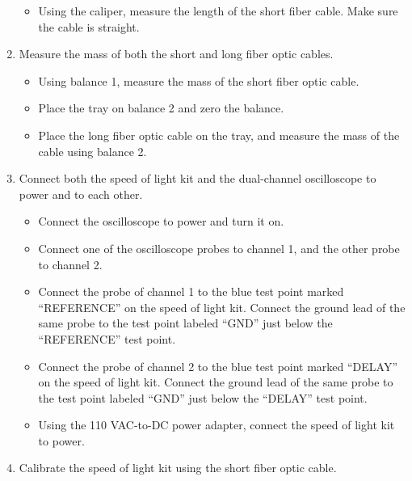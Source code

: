 \documentclass[12pt]{iopart} %
\begin{document}
\begin{enumerate}
  \begin{itemize}
  \item
    Using the caliper, measure the length of the short fiber cable. Make
    sure the cable is straight.
  \end{itemize}
\item
  Measure the mass of both the short and long fiber optic cables.

  \begin{itemize}
  \item
    Using balance 1, measure the mass of the short fiber optic cable.
  \item
    Place the tray on balance 2 and zero the balance.
  \item
    Place the long fiber optic cable on the tray, and measure the mass
    of the cable using balance 2.
  \end{itemize}
\item
  Connect both the speed of light kit and the dual-channel oscilloscope
  to power and to each other.

  \begin{itemize}
  \item
    Connect the oscilloscope to power and turn it on.
  \item
    Connect one of the oscilloscope probes to channel 1, and the other
    probe to channel 2.
  \item
    Connect the probe of channel 1 to the blue test point marked
    ``REFERENCE'' on the speed of light kit. Connect the ground lead of
    the same probe to the test point labeled ``GND'' just below the
    ``REFERENCE'' test point.
  \item
    Connect the probe of channel 2 to the blue test point marked
    ``DELAY'' on the speed of light kit. Connect the ground lead of the
    same probe to the test point labeled ``GND'' just below the
    ``DELAY'' test point.
  \item
    Using the 110 VAC-to-DC power adapter, connect the speed of light
    kit to power.
  \end{itemize}
\item
  Calibrate the speed of light kit using the short fiber optic cable.


\end{enumerate}
\end{document}
